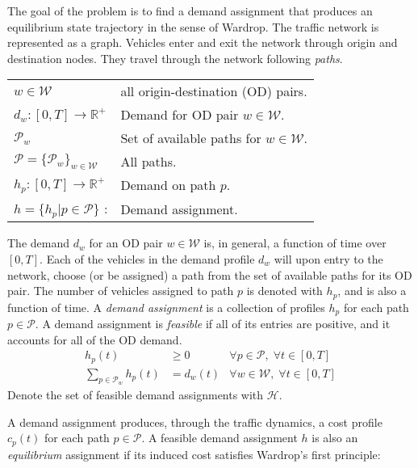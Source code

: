 The goal of the problem is to find a demand assignment that produces an equilibrium state trajectory in the sense of Wardrop\cite{wardrop1952some}. The traffic network  is represented as a graph. Vehicles enter and exit the network through origin and destination nodes. They travel through the network following \textit{paths}. 

\vspace{1em}

\begin{tabular}{ll}
$w\in\mathcal{W}$ & all origin-destination (OD) pairs. \\ 
$d_w : [0,T]\rightarrow \mathbb{R}^+ $  & Demand for OD pair $w\in\mathcal{W}$. \\ 
$\mathcal{P}_w$ & Set of available paths for $w\in\mathcal{W}$. \\
$\mathcal{P}=\{ \mathcal{P}_w \}_{w\in \mathcal{W}}$ & All paths. \\ 
$h_p : [0,T]\rightarrow \mathbb{R}^+ $ & Demand on path $p$. \\
$h=\{h_p | p\in\mathcal{P}\}$ : & Demand assignment.
\end{tabular}

\vspace{1em}

The demand $d_w$ for an OD pair $w\in\mathcal{W}$ is, in general, a function of time over $[0,T]$. Each of the vehicles in the demand profile $d_w$ will upon entry to the network, choose (or be assigned) a path from the set of available paths for its OD pair. The number of vehicles assigned to path $p$ is denoted with $h_p$, and is also a function of time. A \textit{demand assignment} is a collection of profiles $h_p$ for each path $p\in\mathcal{P}$. A demand assignment is \textit{feasible} if all of its entries are positive, and it accounts for all of the OD demand. 
\begin{align}
h_p(t) &\geq 0 & \forall p\in\mathcal{P},\;\forall t\in[0,T] \\
\sum_{p\in \mathcal{P}_w} h_p(t) &= d_w(t) & \forall w\in\mathcal{W}  ,\;\forall t\in[0,T] 
\end{align}
Denote the set of feasible demand assignments with $\mathcal{H}$. %

A demand assignment produces, through the traffic dynamics, a cost profile $c_p(t)$ for each path $p\in\mathcal{P}$. 
A feasible demand assignment $h$ is also an \textit{equilibrium} assignment if its induced cost satisfies Wardrop's first principle: 

